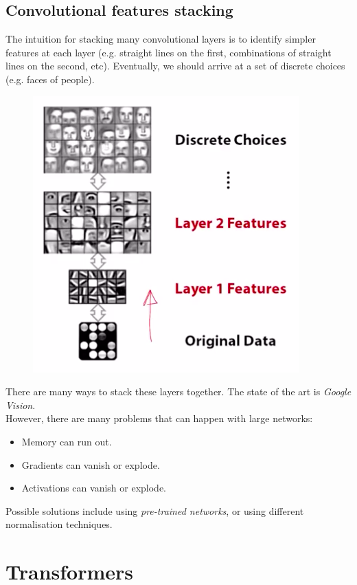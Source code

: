 \subsection{Convolutional features stacking}
The intuition for stacking many convolutional layers is to identify simpler features at each layer (e.g. straight lines on the first, combinations of straight lines on the second, etc). Eventually, we should arrive at a set of discrete choices (e.g. faces of people).
\begin{figure}[H]
\centering
\includegraphics[scale=0.4]{convfeaturestacking.png}
\end{figure}

There are many ways to stack these layers together. The state of the art is \textit{Google Vision}.\\

However, there are many problems that can happen with large networks:
\begin{itemize}
\item Memory can run out.
\item Gradients can vanish or explode.
\item Activations can vanish or explode.
\end{itemize}
Possible solutions include using \textit{pre-trained networks}, or using different normalisation techniques. 







\newpage
\section{Transformers}

